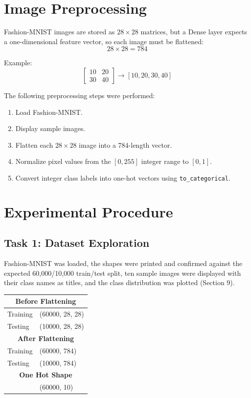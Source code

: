 \documentclass[11pt]{article}
\begin{document}
\section{Image Preprocessing}
Fashion-MNIST images are stored as $28 \times 28$ matrices, but a Dense layer expects a one-dimensional feature vector, so each image must be flattened:
\[
28 \times 28 = 784
\]

Example:
\[
\begin{bmatrix} 10 & 20 \\ 30 & 40 \end{bmatrix} \rightarrow [10, 20, 30, 40]
\]

The following preprocessing steps were performed:
\begin{enumerate}
    \item Load Fashion-MNIST.
    \item Display sample images.
    \item Flatten each $28 \times 28$ image into a 784-length vector.
    \item Normalize pixel values from the $[0, 255]$ integer range to $[0, 1]$.
    \item Convert integer class labels into one-hot vectors using \texttt{to\_categorical}.
\end{enumerate}

\section{Experimental Procedure}

\subsection*{Task 1: Dataset Exploration}
Fashion-MNIST was loaded, the shapes were printed and confirmed against the expected 60,000/10,000 train/test split, ten sample images were displayed with their class names as titles, and the class distribution was plotted (Section 9).

\begin{center}
\begin{tabular}{|l|l|}
\hline
\multicolumn{2}{|c|}{\textbf{Before Flattening}} \\
\hline
Training & (60000, 28, 28) \\
Testing  & (10000, 28, 28) \\
\hline
\multicolumn{2}{|c|}{\textbf{After Flattening}} \\
\hline
Training & (60000, 784) \\
Testing  & (10000, 784) \\
\hline
\multicolumn{2}{|c|}{\textbf{One Hot Shape}} \\
\hline
& (60000, 10) \\
\hline
\end{tabular}
\end{center}
\end{document}
